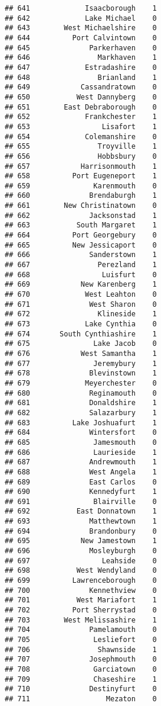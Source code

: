 \documentclass[
]{article}
\begin{document}
\begin{verbatim}
## 641             Isaacborough    1
## 642             Lake Michael    0
## 643        West Michaelshire    0
## 644          Port Calvintown    0
## 645              Parkerhaven    0
## 646                Markhaven    1
## 647             Estradashire    0
## 648                Brianland    1
## 649            Cassandratown    0
## 650           West Dannyberg    0
## 651        East Debraborough    0
## 652             Frankchester    1
## 653                 Lisafort    1
## 654             Colemanshire    0
## 655                Troyville    1
## 656                Hobbsbury    0
## 657            Harrisonmouth    1
## 658          Port Eugeneport    1
## 659               Karenmouth    0
## 660              Brendaburgh    1
## 661        New Christinatown    0
## 662              Jacksonstad    1
## 663           South Margaret    1
## 664          Port Georgebury    0
## 665          New Jessicaport    0
## 666              Sanderstown    1
## 667                Perezland    1
## 668                 Luisfurt    0
## 669            New Karenberg    1
## 670             West Leahton    0
## 671              West Sharon    0
## 672                Klineside    1
## 673             Lake Cynthia    0
## 674       South Cynthiashire    1
## 675               Lake Jacob    0
## 676            West Samantha    1
## 677               Jeremybury    1
## 678              Blevinstown    1
## 679             Meyerchester    0
## 680              Reginamouth    0
## 681              Donaldshire    1
## 682              Salazarbury    1
## 683          Lake Joshuafurt    1
## 684              Wintersfort    0
## 685               Jamesmouth    0
## 686               Laurieside    1
## 687              Andrewmouth    1
## 688              West Angela    1
## 689              East Carlos    0
## 690              Kennedyfurt    1
## 691               Blairville    0
## 692           East Donnatown    1
## 693              Matthewtown    1
## 694              Brandonbury    0
## 695            New Jamestown    1
## 696              Mosleyburgh    0
## 697                 Leahside    0
## 698           West Wendyland    0
## 699          Lawrenceborough    0
## 700              Kennethview    0
## 701           West Mariafort    1
## 702          Port Sherrystad    0
## 703        West Melissashire    1
## 704              Pamelamouth    0
## 705               Lesliefort    0
## 706                Shawnside    1
## 707              Josephmouth    0
## 708               Garciatown    0
## 709               Chaseshire    1
## 710              Destinyfurt    0
## 711                  Mezaton    0

\end{verbatim}
\end{document}
